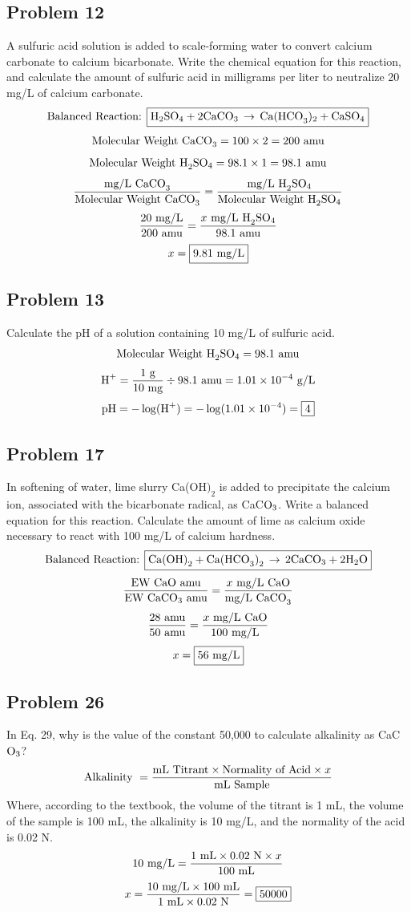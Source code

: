 \subsection*{Problem 12}
A sulfuric acid solution is added to scale-forming water to convert calcium carbonate to calcium bicarbonate. Write the chemical equation for this reaction, and calculate the amount of sulfuric acid in milligrams per liter to neutralize 20 mg/L of calcium carbonate.
\[\textnormal{Balanced Reaction: }\boxed{\textnormal{H}_2\textnormal{SO}_4+2\textnormal{CaCO}_3\,\rightarrow\,\textnormal{Ca(HCO}_3)_2+\textnormal{CaSO}_4}\]
\[\textnormal{Molecular Weight CaCO}_3=100\times 2=200\textnormal{ amu}\]
\[\textnormal{Molecular Weight H}_2\textnormal{SO}_4=98.1\times 1=98.1\textnormal{ amu}\]
\[\frac{\textnormal{mg/L CaCO}_3}{\textnormal{Molecular Weight CaCO}_3}=\frac{\textnormal{mg/L H}_2\textnormal{SO}_4}{\textnormal{Molecular Weight H}_2\textnormal{SO}_4}\]
\[\frac{20\textnormal{ mg/L}}{\textnormal{200 amu}}=\frac{x \textnormal{ mg/L H}_2\textnormal{SO}_4}{98.1\textnormal{ amu}}\]
\[x=\boxed{9.81\textnormal{ mg/L}}\]
\subsection*{Problem 13}
Calculate the pH of a solution containing 10 mg/L of sulfuric acid.
\[\textnormal{Molecular Weight H}_2\textnormal{SO}_4=98.1\textnormal{ amu}\]
\[\textnormal{H}^+=\frac{1 \textnormal{ g}}{10 \textnormal{ mg}}\div 98.1\textnormal{ amu}=1.01\times 10^{-4}\textnormal{ g/L}\]
\[\textnormal{pH}=-\log(\textnormal{H}^+)=-\log(1.01\times 10^{-4})=\boxed{4}\]
\subsection*{Problem 17}
In softening of water, lime slurry Ca(OH\()_2\) is added to precipitate the calcium ion, associated with the bicarbonate radical, as CaC\(\textnormal{O}_3\). Write a balanced equation for this reaction. Calculate the amount of lime as calcium oxide necessary to react with 100 mg/L of calcium hardness.
\[\textnormal{Balanced Reaction: }\boxed{\textnormal{Ca(OH)}_2+\textnormal{Ca(HCO}_3\textnormal{)}_2\,\rightarrow\,2\textnormal{CaCO}_3+2\textnormal{H}_2\textnormal{O}}\]
\[\frac{\textnormal{EW CaO amu}}{\textnormal{EW CaCO}_3\textnormal{ amu}}=\frac{x\textnormal{ mg/L CaO}}{\textnormal{mg/L CaCO}_3}\]
\[\frac{28\textnormal{ amu}}{50\textnormal{ amu}}=\frac{x\textnormal{ mg/L CaO}}{100\textnormal{ mg/L}}\]
\[x=\boxed{56\textnormal{ mg/L}}\]
\subsection*{Problem 26}
In Eq. 29, why is the value of the constant 50,000 to calculate alkalinity as CaC\(\textnormal{O}_3\)?
\[\textnormal{Alkalinity }=\frac{\textnormal{mL Titrant}\times\textnormal{Normality of Acid}\times x}{\textnormal{mL Sample}}\]
Where, according to the textbook, the volume of the titrant is 1 mL, the volume of the sample is 100 mL, the alkalinity is 10 mg/L, and the normality of the acid is 0.02 N.
\[\textnormal{10 mg/L}=\frac{1\textnormal{ mL}\times 0.02\textnormal{ N}\times x}{\textnormal{100 mL}}\]
\[x=\frac{\textnormal{10 mg/L}\times\textnormal{100 mL}}{1\textnormal{ mL}\times 0.02\textnormal{ N}}=\boxed{50000}\]